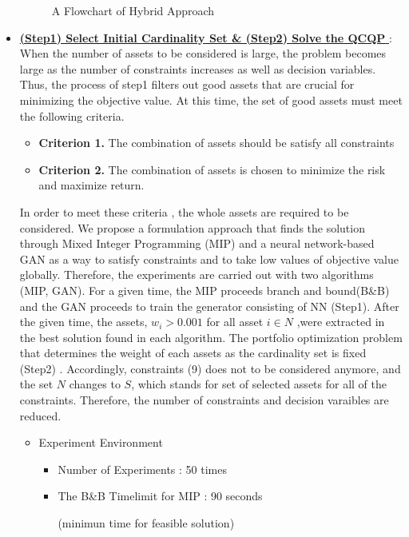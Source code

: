 \documentclass[11pt]{article}
\begin{document}
\begin{itemize}
\begin{figure}[h]
\begin{center}
			\caption{A Flowchart of Hybrid Approach} \label{fig:flowchart}
		\end{center}
	\end{figure}

	\item[]\underline{\textbf{(Step1) Select Initial Cardinality Set \& (Step2) Solve the QCQP }} :
	 When the number of assets to be considered is large, the problem becomes large as the number of constraints increases as well as decision variables. 
	 Thus, the process of step1 filters out good assets that are crucial for minimizing the objective value. At this time, the set of good assets must meet the following criteria.
	 \begin{itemize}
	 	\item[]\textbf{Criterion 1.} The combination of assets should be satisfy all constraints
	 	\item[]\textbf{Criterion 2.} The combination of assets is chosen to minimize the risk and maximize return.
	 \end{itemize}
	  In order to meet these criteria , the whole assets are required to be considered. We propose a formulation approach that finds the solution through Mixed Integer Programming (MIP) and a neural network-based GAN as a way to satisfy constraints and to take low values of objective value globally. Therefore, the experiments are carried out with two algorithms (MIP, GAN). For a given time, the MIP proceeds branch and bound(B\&B) and the GAN proceeds to train the generator consisting of NN (Step1). After the given time, the assets, $w_i> 0.001$ for all asset $i \in N$ ,were extracted in the best solution found in each algorithm. The portfolio optimization problem that determines the weight of each assets as the cardinality set is fixed (Step2) . Accordingly, constraints (9) does not to be considered anymore, and the set $N$ changes to $S$, which stands for set of selected assets for all of the constraints. Therefore, the number of constraints and decision varaibles are reduced. 
	 \begin{itemize}
	 	\item Experiment Environment
	 	\begin{itemize}
	 		\item Number of Experiments : 50 times
	 		\item The B\&B Timelimit for MIP : 90 seconds  \begin{scriptsize}	(minimun time for feasible solution)	\end{scriptsize}

\end{itemize}
\end{itemize}
\end{itemize}
\end{document}
